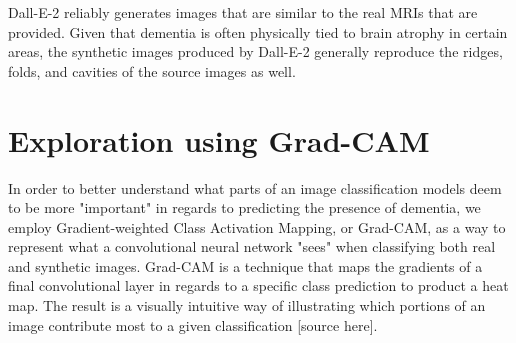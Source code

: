 \documentclass [MS] {uclathes}
\begin{document}
Dall-E-2 reliably generates images that are similar to the real MRIs that are provided. Given that dementia is often 
physically tied to brain atrophy in certain areas, the synthetic images produced by Dall-E-2 generally reproduce the 
ridges, folds, and cavities of the source images as well.

\chapter{Exploration using Grad-CAM}
In order to better understand what parts of an image classification models deem to be more "important" in regards to 
predicting the presence of dementia, we employ Gradient-weighted Class Activation Mapping, or Grad-CAM, as a way to 
represent what a convolutional neural network "sees" when classifying both real and synthetic images. Grad-CAM is a 
technique that maps the gradients of a final convolutional layer in regards to a specific class prediction to product a 
heat map. The result is a visually intuitive way of illustrating which portions of an image contribute most to a given 
classification [source here].
\end{document}
